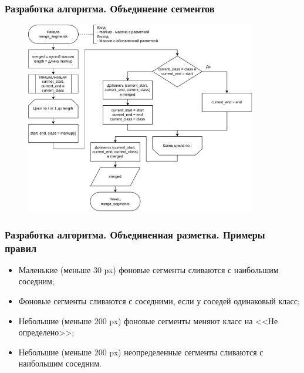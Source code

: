 \documentclass[gray]{beamer}
\begin{document}
\begin{frame}
    \frametitle{Разработка алгоритма. Объединение сегментов}
    \begin{figure}[H]
        \centering
        \hspace{1cm}\includegraphics[width=0.9\textwidth]{diag/merge.segments.pdf}
    \end{figure}
\end{frame}

\begin{frame}
    \frametitle{Разработка алгоритма. Объединенная разметка. Примеры правил}
    \begin{itemize}
        \item Маленькие (меньше 30 px) фоновые сегменты сливаются с наибольшим соседним;
        \item Фоновые сегменты сливаются с соседними, если у соседей одинаковый класс;
        \item Небольшие (меньше 200 px) фоновые сегменты меняют класс на <<Не определено>>;
        \item Небольшие (меньше 200 px) неопределенные сегменты сливаются с наибольшим соседним.
    \end{itemize}
\end{frame}
\end{document}
